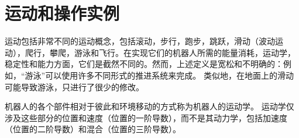 \section{运动和操作实例}


运动包括非常不同的运动概念，包括滚动，步行，跑步，跳跃，滑动（波动运动），爬行，攀爬，游泳和飞行。在实现它们的机器人所需的能量消耗，运动学，稳定性和能力方面，它们是截然不同的。然而，上述定义是宽松和不明确的：例如，“游泳”可以使用许多不同形式的推进系统来完成。 类似地，在地面上的滑动可能导致游泳，只进行了很少的修改。


机器人的各个部件相对于彼此和环境移动的方式称为机器人的运动学。 运动学仅涉及这些部分的位置和速度（位置的一阶导数），而不是其动力学，包括加速度（位置的二阶导数）和混合（位置的三阶导数）。


